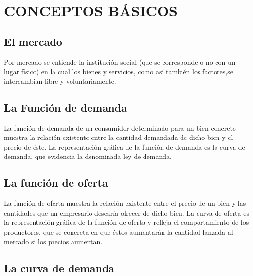 \documentclass[12pt]{book}
\begin{document}
\chapter{CONCEPTOS BÁSICOS}
\section{El mercado}
Por mercado se entiende la institución social (que se corresponde o no con un lugar físico) en la cual los bienes y servicios, como así también los factores,se intercambian libre y voluntariamente.


\section{La Función de demanda}La función de demanda de un consumidor determinado para un bien concreto muestra la relación
existente entre la cantidad demandada de dicho bien y el precio de éste. La representación gráfica de la función de demanda es la curva de demanda, que evidencia la denominada ley de demanda.


\section{La función de oferta}La función de oferta muestra la relación existente entre el precio de un bien y las cantidades que un empresario desearía ofrecer de dicho bien. La curva de oferta es la representación gráfica de la función de oferta y refleja el comportamiento de los productores, que se concreta en que éstos aumentarán la cantidad lanzada al mercado si los precios aumentan.



\section{La curva de demanda}
\end{document}
